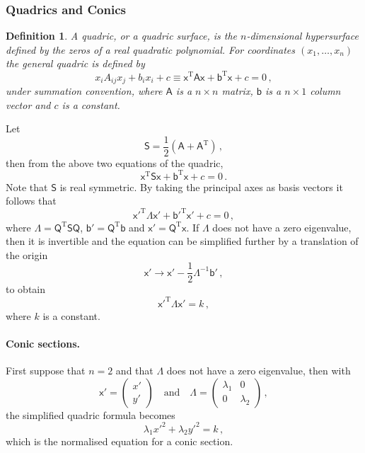 \documentclass{article}
\theoremstyle{plain}\theoremheaderfont{\normalfont\itshape}\theorembodyfont{\rmfamily}\theoremseparator{.}\newtheorem*{rem}{Remark}\newtheorem*{ex}{Example}\newtheorem*{proof}{Proof}\newtheorem*{altp}{Alternative proof}
\theoremstyle{plain}\theoremheaderfont{\normalfont\bfseries}\theorembodyfont{\rmfamily}\theoremseparator{.}\newtheorem{thm}{Theorem}[section]\newtheorem{lem}[thm]{Lemma}\newtheorem{prop}[thm]{Proposition}\newtheorem*{cor}{Corollary}\newtheorem{defn}[thm]{Definition}\newtheorem{clm}[thm]{Claim}\newtheorem{clminproof}{Claim}
\theoremstyle{break}\theoremheaderfont{\normalfont\itshape}\theorembodyfont{\rmfamily}\theoremseparator{.\medskip}\newtheorem*{proofskip}{Proof}\newtheorem*{exs}{Examples}\newtheorem*{rems}{Remarks}
\theoremstyle{break}\theoremheaderfont{\normalfont\bfseries}\theorembodyfont{\rmfamily}\theoremseparator{.\medskip}\newtheorem{lemskip}[thm]{Lemma}\newtheorem{defnskip}[thm]{Definition}\newtheorem{propskip}[thm]{Proposition}\newtheorem{thmskip}[thm]{Theorem}
\numberwithin{equation}{section}
\newcommand{\tp}{^\mathrm{T}}
\begin{document}
	\subsubsection{Quadrics and Conics}
	\begin{defn}
		A \textit{quadric}, or a \textit{quadric surface}, is the \(n\)-dimensional hypersurface defined by the zeros of a real quadratic polynomial. For coordinates \((x_1,\dots,x_n)\) the general quadric is defined by
		\[x_iA_{ij}x_j+b_ix_i+c\equiv\mathsf{x\tp Ax+b\tp x}+c=0\,,\]
		under summation convention, where \(\mathsf{A}\) is a \(n\times n\) matrix, \(\mathsf{b}\) is a \(n\times 1\) column vector and \(c\) is a constant.
	\end{defn}
	Let
	\[\mathsf{S}=\frac{1}{2}(\mathsf{A+A\tp})\,,\]
	then from the above two equations of the quadric,
	\[\mathsf{x\tp Sx+b\tp x}+c=0\,.\]
	Note that \(\mathsf{S}\) is real symmetric. By taking the principal axes as basis vectors it follows that
	\[\mathsf{x'^{\mathrm{T}}\Lambda x'+b'^{\mathrm{T}}x'}+c=0\,,\]
	where \(\mathsf{\Lambda=Q\tp SQ}\), \(\mathsf{b'=Q\tp b}\) and \(\mathsf{x'=Q\tp x}\). If \(\mathsf{\Lambda}\) does not have a zero eigenvalue, then it is invertible and the equation can be simplified further by a translation of the origin
	\[\mathsf{x'\to x'}-\frac{1}{2}\mathsf{\Lambda}^{-1}\mathsf{b'}\,,\]
	to obtain
	\[\mathsf{x'^{\mathrm{T}}\Lambda x'}=k\,,\]
	where \(k\) is a constant.
	
	\paragraph{Conic sections.} First suppose that \(n=2\) and that \(\mathsf{\Lambda}\) does not have a zero eigenvalue, then with
	\[\mathsf{x'}=\begin{pmatrix}
		x' \\ y'
	\end{pmatrix}\quad\text{and}\quad\mathsf{\Lambda}=\begin{pmatrix}
		\lambda_1 & 0 \\ 0 & \lambda_2
	\end{pmatrix}\,,\]
	the simplified quadric formula becomes
	\[\lambda_1x'^2+\lambda_2y'^2=k\,,\]
	which is the normalised equation for a conic section.
\end{document}
